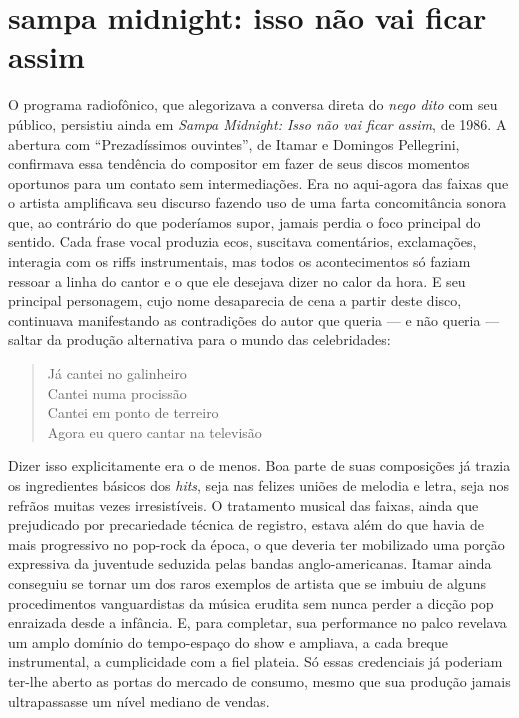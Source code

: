 \section{sampa midnight: isso não vai ficar assim}

O programa radiofônico, que alegorizava a conversa direta do \textit{nego dito}
com seu público, persistiu ainda em \textit{Sampa Midnight: Isso não vai ficar
assim}, de 1986. A abertura com ``Prezadíssimos ouvintes'', de Itamar e Domingos
Pellegrini, confirmava essa tendência do compositor em fazer de seus
discos momentos oportunos para um contato sem intermediações. Era no
aqui-agora das faixas que o artista amplificava seu discurso fazendo uso
de uma farta concomitância sonora que, ao contrário do que poderíamos
supor, jamais perdia o foco principal do sentido. Cada frase vocal
produzia ecos, suscitava comentários, exclamações, interagia com os
riffs instrumentais, mas todos os acontecimentos só faziam ressoar a
linha do cantor e o que ele desejava dizer no calor da hora. E seu
principal personagem, cujo nome desaparecia de cena a partir deste
disco, continuava manifestando as contradições do autor que queria --- e
não queria --- saltar da produção alternativa para o mundo das
celebridades: 

\begin{verse}
\small{Já cantei no galinheiro\\
Cantei numa procissão\\
Cantei em ponto de terreiro\\
Agora eu quero cantar na televisão}
\end{verse}

Dizer isso explicitamente era o de menos. Boa parte de suas composições
já trazia os ingredientes básicos dos \textit{hits}, seja nas felizes uniões de
melodia e letra, seja nos refrãos muitas vezes irresistíveis. O
tratamento musical das faixas, ainda que prejudicado por precariedade
técnica de registro, estava além do que havia de mais progressivo no
pop-rock da época, o que deveria ter mobilizado uma porção expressiva da
juventude seduzida pelas bandas anglo-americanas. Itamar ainda conseguiu
se tornar um dos raros exemplos de artista que se imbuiu de alguns
procedimentos vanguardistas da música erudita sem nunca perder a dicção
pop enraizada desde a infância. E, para completar, sua performance no
palco revelava um amplo domínio do tempo-espaço do show e ampliava, a
cada breque instrumental, a cumplicidade com a fiel plateia. Só essas
credenciais já poderiam ter-lhe aberto as portas do mercado de consumo,
mesmo que sua produção jamais ultrapassasse um nível mediano de vendas.

